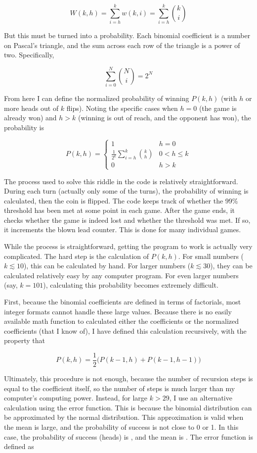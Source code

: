 \documentclass{article}
\begin{document}
\[
W(k,h)=\sum_{i=h}^{k}w(k,i)=\sum_{i=h}^{k}\binom{k}{i}
\]

But this must be turned into a probability.
Each binomial coefficient is a number on Pascal's triangle, and the sum across each row of the triangle is a power of two.
Specifically,

\[
\sum_{i=0}^{N}\binom{N}{i}=2^{N}
\]

From here I can define the normalized probability of winning $P(k,h)$ (with $h$ or more heads out of $k$ flips).
Noting the specific cases when $h=0$ (the game is already won) and $h>k$ (winning is out of reach, and the opponent has won), the probability is

\[
P(k,h)=
\begin{cases}
1                                                       & h=0 \\
\displaystyle \frac{1}{2^{k}}\sum_{i=h}^{k}\binom{k}{h} & 0<h\leq k \\
0                                                       & h>k
\end{cases}
\]

The process used to solve this riddle in the code is relatively straightforward.
During each turn (actually only some of the turns), the probability of winning is calculated, then the coin is flipped.
The code keeps track of whether the 99\% threshold has been met at some point in each game.
After the game ends, it checks whether the game is indeed lost and whether the threshold was met.
If so, it increments the blown lead counter.
This is done for many individual games.

While the process is straightforward, getting the program to work is actually very complicated.
The hard step is the calculation of $P(k,h)$.
For small numbers ($k\lesssim10$), this can be calculated by hand.
For larger numbers ($k\lesssim30$), they can be calculated relatively easy by any computer program.
For even larger numbers (say, $k=101$), calculating this probability becomes extremely difficult.

First, because the binomial coefficients are defined in terms of factorials, most integer formats cannot handle these large values.
Because there is no easily available math function to calculated either the coefficients or the normalized coefficients (that I know of), I have defined this calculation recursively, with the property that

\[
P(k,h)=\frac{1}{2}\big(P(k-1,h)+P(k-1,h-1)\big)
\]

Ultimately, this procedure is not enough, because the number of recursion steps is equal to the coefficient itself, so the number of steps is much larger than my computer's computing power.
Instead, for large $k>29$, I use an alternative calculation using the error function.
This is because the binomial distribution can be approximated by the normal distribution.
This approximation is valid when the mean is large, and the probability of success is not close to 0 or 1.
In this case, the probability of success (heads) is , and the mean is .
The error function is defined as
\end{document}
